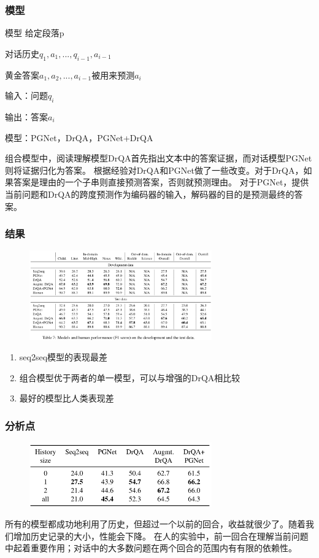 \documentclass{beamer}
\begin{document}
\begin{frame}
    \frametitle{模型}
    \begin{block}{模型}
    给定段落p

    对话历史${q_1,a_1,...,q_{i-1},a_{i-1}}$

    黄金答案$a_1,a_2,...,a_{i-1}$被用来预测$a_i$

    输入：问题$q_i$

    输出：答案$a_i$

    模型：PGNet，DrQA，PGNet+DrQA
    \end{block}

    组合模型中，阅读理解模型DrQA首先指出文本中的答案证据，而对话模型PGNet则将证据归化为答案。
    根据经验对DrQA和PGNet做了一些改变。对于DrQA，如果答案是理由的一个子串则直接预测答案，否则就预测理由。
    对于PGNet，提供当前问题和DrQA的跨度预测作为编码器的输入，解码器的目的是预测最终的答案。

\end{frame}

\begin{frame}
    \frametitle{结果}
    \begin{figure}[tb]
        \centering
        \includegraphics[width=0.7\textwidth]{fig/result.png}
    \end{figure}
    \begin{enumerate}
        \item seq2seq模型的表现最差
        \item 组合模型优于两者的单一模型，可以与增强的DrQA相比较
        \item 最好的模型比人类表现差
    \end{enumerate}
\end{frame}

\begin{frame}
    \frametitle{分析点}
    \begin{figure}[tb]
        \centering
        \includegraphics[width=0.7\textwidth]{fig/ana.png}
    \end{figure}
    所有的模型都成功地利用了历史，但超过一个以前的回合，收益就很少了。随着我们增加历史记录的大小，性能会下降。
    在人的实验中，前一回合在理解当前问题中起着重要作用；对话中的大多数问题在两个回合的范围内有有限的依赖性。
\end{frame}
\end{document}
